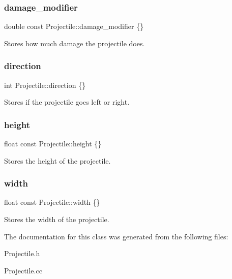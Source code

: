 \subsubsection{\texorpdfstring{damage\+\_\+modifier}{damage\_modifier}}
{\footnotesize\ttfamily double const Projectile\+::damage\+\_\+modifier \{\}\hspace{0.3cm}{\ttfamily [protected]}}

Stores how much damage the projectile does. \mbox{\label{classProjectile_a5d30e0f7e8033f0d72fe759a8dd02b30}} 
\subsubsection{\texorpdfstring{direction}{direction}}
{\footnotesize\ttfamily int Projectile\+::direction \{\}\hspace{0.3cm}{\ttfamily [protected]}}

Stores if the projectile goes left or right. \mbox{\label{classProjectile_a4ea221974935c400c17d2acbee33b0ee}} 
\subsubsection{\texorpdfstring{height}{height}}
{\footnotesize\ttfamily float const Projectile\+::height \{\}\hspace{0.3cm}{\ttfamily [protected]}}

Stores the height of the projectile. \mbox{\label{classProjectile_a526dd3f231b015203325d5d7a2e89159}} 
\subsubsection{\texorpdfstring{width}{width}}
{\footnotesize\ttfamily float const Projectile\+::width \{\}\hspace{0.3cm}{\ttfamily [protected]}}

Stores the width of the projectile. 

The documentation for this class was generated from the following files\+:\begin{DoxyCompactItemize}
\item 
Projectile.\+h\item 
Projectile.\+cc\end{DoxyCompactItemize}
